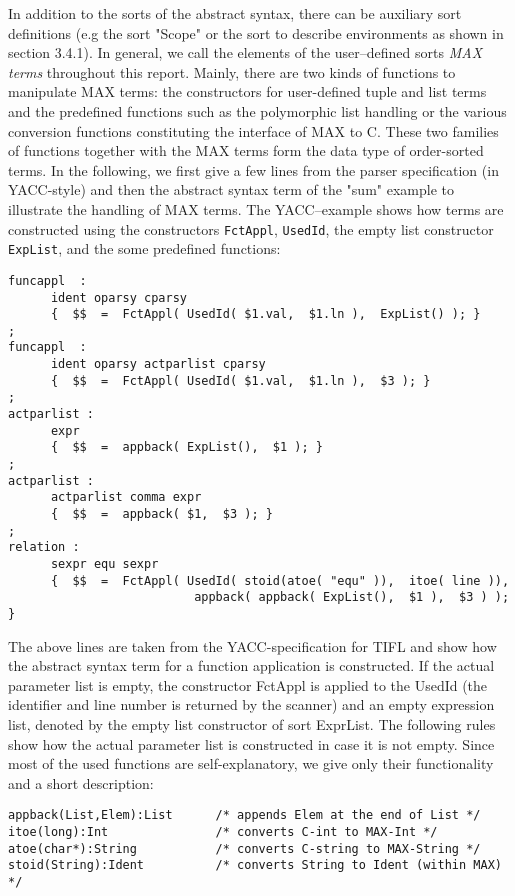 In addition to the sorts of the abstract syntax, there can be auxiliary sort definitions (e.g the sort "Scope" or the sort to describe
environments as shown in section 3.4.1). In general, we call the
elements of the user--defined sorts {\em MAX terms} throughout this 
report.
\noindent
Mainly, there are two kinds of functions to manipulate MAX terms:
the constructors for user-defined tuple and list terms and the 
predefined functions such as the polymorphic list handling or the various
conversion functions constituting the interface of MAX to C. These 
two families of functions together with the MAX terms form the data 
type of order-sorted terms. In the following, we first give a few 
lines from the 
parser specification (in YACC-style) and then the abstract syntax
term of 
the "sum" example to illustrate the handling of MAX terms. 
\noindent
The YACC--example shows how terms
are constructed using the constructors \verb/FctAppl/, \verb/UsedId/,
the empty list constructor \verb/ExpList/, and the some predefined
functions:

\begin{verbatim}
funcappl  :
      ident oparsy cparsy
      {  $$  =  FctAppl( UsedId( $1.val,  $1.ln ),  ExpList() ); }
;
funcappl  :
      ident oparsy actparlist cparsy
      {  $$  =  FctAppl( UsedId( $1.val,  $1.ln ),  $3 ); }
;
actparlist :
      expr
      {  $$  =  appback( ExpList(),  $1 ); }
;
actparlist : 
      actparlist comma expr
      {  $$  =  appback( $1,  $3 ); }
;
relation :
      sexpr equ sexpr
      {  $$  =  FctAppl( UsedId( stoid(atoe( "equ" )),  itoe( line )),
                          appback( appback( ExpList(),  $1 ),  $3 ) ); }

\end{verbatim}
The above lines are taken from the YACC-specification for TIFL and show how the
abstract syntax term for a function application is constructed.
If the actual parameter list is empty, the constructor FctAppl is 
applied to the UsedId (the identifier and line number is returned by 
the scanner) and an empty expression list, denoted by the empty list
constructor of sort ExprList. The following rules show how the actual
parameter list is constructed in case it is not empty. Since most of the 
used functions are self-explanatory, we give only 
their functionality and a short description:


\begin{verbatim} 
appback(List,Elem):List      /* appends Elem at the end of List */
itoe(long):Int               /* converts C-int to MAX-Int */
atoe(char*):String           /* converts C-string to MAX-String */
stoid(String):Ident          /* converts String to Ident (within MAX) */

\end{verbatim}	      

